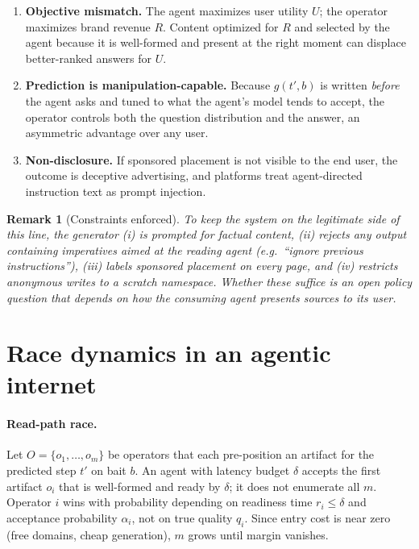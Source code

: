 \documentclass[11pt]{article}
\newtheorem{remark}{Remark}
\begin{document}
\begin{enumerate}
\item \textbf{Objective mismatch.} The agent maximizes user utility $U$; the operator maximizes
      brand revenue $R$. Content optimized for $R$ and selected by the agent because it is
      well-formed and present at the right moment can displace better-ranked answers for $U$.
\item \textbf{Prediction is manipulation-capable.} Because $g(t',b)$ is written \emph{before} the
      agent asks and tuned to what the agent's model tends to accept, the operator controls
      both the question distribution and the answer, an asymmetric advantage over any user.
\item \textbf{Non-disclosure.} If sponsored placement is not visible to the end user, the outcome is
      deceptive advertising, and platforms treat agent-directed instruction text as prompt
      injection.
\end{enumerate}

\begin{remark}[Constraints enforced]
To keep the system on the legitimate side of this line, the generator (i) is prompted for factual
content, (ii) rejects any output containing imperatives aimed at the reading agent
(e.g.\ ``ignore previous instructions''), (iii) labels sponsored placement on every page, and
(iv) restricts anonymous writes to a scratch namespace. Whether these suffice is an open policy
question that depends on how the consuming agent presents sources to its user.
\end{remark}

\section{Race dynamics in an agentic internet}
\paragraph{Read-path race.} Let $O=\{o_1,\dots,o_m\}$ be operators that each pre-position an artifact
for the predicted step $t'$ on bait $b$. An agent with latency budget $\delta$ accepts the first
artifact $o_i$ that is well-formed and ready by $\delta$; it does not enumerate all $m$. Operator $i$
wins with probability depending on readiness time $r_i\le\delta$ and acceptance probability $\alpha_i$,
not on true quality $q_i$. Since entry cost is near zero (free domains, cheap generation), $m$ grows
until margin vanishes.
\end{document}
